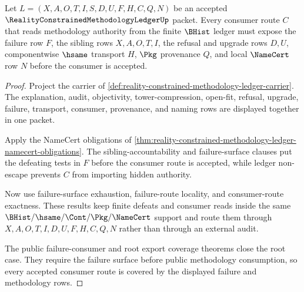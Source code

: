 \begin{theorem}
\label{thm:reality-constrained-methodology-ledger-failure-consumer-coverage}
Let $L=(X,A,O,T,I,S,D,U,F,H,C,Q,N)$ be an accepted
$\RealityConstrainedMethodologyLedgerUp$ packet. Every consumer route $C$ that
reads methodology authority from the finite $\BHist$ ledger must expose the
failure row $F$, the sibling rows $X,A,O,T,I$, the refusal and upgrade rows
$D,U$, componentwise $\hsame$ transport $H$, $\Pkg$ provenance $Q$, and local
$\NameCert$ row $N$ before the consumer is accepted.
\end{theorem}
\begin{proof}
Project the carrier of
\autoref{def:reality-constrained-methodology-ledger-carrier}. The explanation,
audit, objectivity, tower-compression, open-fit, refusal, upgrade, failure,
transport, consumer, provenance, and naming rows are displayed together in one
packet.

Apply the NameCert obligations of
\autoref{thm:reality-constrained-methodology-ledger-namecert-obligations}. The
sibling-accountability and failure-surface clauses put the defeating tests in
$F$ before the consumer route is accepted, while ledger non-escape prevents
$C$ from importing hidden authority.

Now use failure-surface exhaustion, failure-route locality, and consumer-route
exactness. These results keep finite defeats and consumer reads inside the same
$\BHist/\hsame/\Cont/\Pkg/\NameCert$ support and route them through
$X,A,O,T,I,D,U,F,H,C,Q,N$ rather than through an external audit.

The public failure-consumer and root export coverage theorems close the root
case. They require the failure surface before public methodology consumption,
so every accepted consumer route is covered by the displayed failure and
methodology rows.
\end{proof}

